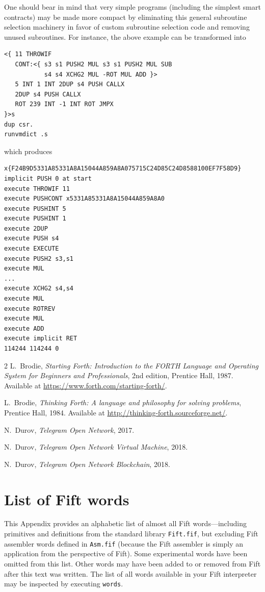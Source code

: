 \documentclass[12pt,oneside]{article}
\def\markbothsame#1{\fancyhead[C]{#1}}
\def\myappendix#1{\section{#1}\fancyhead[C]{\textsc{Appendix \textbf{\thesection.} #1}}}
\begin{document}
One should bear in mind that very simple programs (including the simplest smart contracts) may be made more compact by eliminating this general subroutine selection machinery in favor of custom subroutine selection code and removing unused subroutines. For instance, the above example can be transformed into
\begin{verbatim}
<{ 11 THROWIF
   CONT:<{ s3 s1 PUSH2 MUL s3 s1 PUSH2 MUL SUB
           s4 s4 XCHG2 MUL -ROT MUL ADD }>
   5 INT 1 INT 2DUP s4 PUSH CALLX
   2DUP s4 PUSH CALLX
   ROT 239 INT -1 INT ROT JMPX
}>s
dup csr.
runvmdict .s
\end{verbatim}
which produces
\begin{verbatim}
x{F24B9D5331A85331A8A15044A859A8A075715C24D85C24D8588100EF7F58D9}
implicit PUSH 0 at start
execute THROWIF 11
execute PUSHCONT x5331A85331A8A15044A859A8A0
execute PUSHINT 5
execute PUSHINT 1
execute 2DUP
execute PUSH s4
execute EXECUTE
execute PUSH2 s3,s1
execute MUL
...
execute XCHG2 s4,s4
execute MUL
execute ROTREV
execute MUL
execute ADD
execute implicit RET
114244 114244 0
\end{verbatim}

%
%
%
%

\clearpage
\markbothsame{\textsc{References}}

\begin{thebibliography}{2}
  {\sc L.~Brodie}, {\sl Starting Forth: Introduction to the FORTH Language and Operating System for Beginners and Professionals}, 2nd edition, Prentice Hall, 1987. Available at \url{https://www.forth.com/starting-forth/}.

  {\sc L.~Brodie}, {\sl Thinking Forth: A language and philosophy for solving problems}, Prentice Hall, 1984. Available at \url{http://thinking-forth.sourceforge.net/}.

  {\sc N.~Durov}, {\sl Telegram Open Network}, 2017.

  {\sc N.~Durov}, {\sl Telegram Open Network Virtual Machine}, 2018.

  {\sc N.~Durov}, {\sl Telegram Open Network Blockchain}, 2018.
\end{thebibliography}

\clearpage
\appendix\myappendix{List of Fift words}\label{app:words}
This Appendix provides an alphabetic list of almost all Fift words---including primitives and definitions from the standard library {\tt Fift.fif}, but excluding Fift assembler words defined in {\tt Asm.fif} (because the Fift assembler is simply an application from the perspective of Fift). Some experimental words have been omitted from this list. Other words may have been added to or removed from Fift after this text was written. The list of all words available in your Fift interpreter may be inspected by executing {\tt words}.
\end{document}
